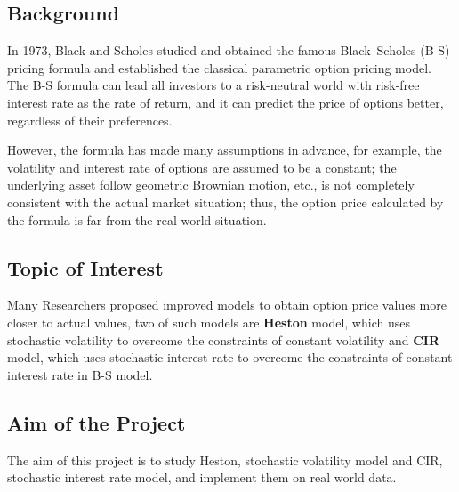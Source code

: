 \subsection{Background}
    In 1973, Black and Scholes studied and obtained the famous
    Black–Scholes (B-S) pricing formula and established the classical
    parametric option pricing model.
    The B-S formula can lead all investors to a risk-neutral world with
    risk-free interest rate as the rate of return, and it can predict
    the price of options better, regardless of their preferences.

    However, the formula has made many assumptions in advance,
    for example, the volatility and interest rate of options are assumed
    to be a constant;
    the underlying asset follow geometric Brownian motion, etc.,
    is not completely consistent with the actual market situation;
    thus, the option price calculated by the formula is far from the
    real world situation.


\subsection{Topic of Interest}
    Many Researchers proposed improved models to obtain option price
    values more closer to actual values, two of such models are
    \textbf{Heston} model, which uses stochastic volatility to overcome
    the constraints of constant volatility and \textbf{CIR} model,
    which uses stochastic interest rate to overcome the constraints of
    constant interest rate in B-S model.


\subsection{Aim of the Project}
    The aim of this project is to study Heston, stochastic volatility model
    and CIR, stochastic interest rate model, and implement them on real
    world data.



